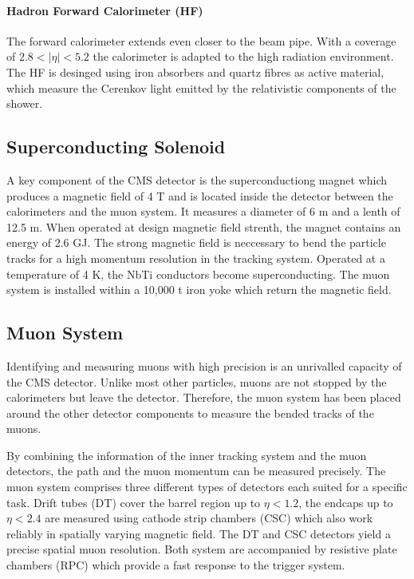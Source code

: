 \paragraph{Hadron Forward Calorimeter (HF)} 
The forward calorimeter extends even closer to the beam pipe. With a coverage of
$2.8 < |\eta| < 5.2$ the calorimeter is adapted to the high radiation
environment. The HF is desinged using iron absorbers and quartz fibres as active
material, which measure the Cerenkov light emitted by the relativistic
components of the shower.

\subsection{Superconducting Solenoid}

A key component of the CMS detector is the superconductiong magnet which
produces a magnetic field of 4 T and is located inside the detector between the
calorimeters and the muon system. It measures a diameter of 6 m and a lenth of
12.5 m. When operated at design magnetic field strenth, the magnet contains an
energy of 2.6 GJ. The strong magnetic field is neccessary to bend the particle
tracks for a high momentum resolution in the tracking system. Operated at a
temperature of 4 K, the NbTi conductors become superconducting. The muon system
is installed within a 10,000 t iron yoke which return the magnetic field.

\subsection{Muon System}

Identifying and measuring muons with high precision is an unrivalled capacity of
the CMS detector. Unlike most other particles, muons are not stopped by the
calorimeters but leave the detector. Therefore, the muon system has been placed
around the other detector components to measure the bended tracks of the muons.

By combining the information of the inner tracking system and the muon
detectors, the path and the muon momentum can be measured precisely. The muon
system comprises three different types of detectors each suited for a specific
task. Drift tubes (DT) cover the barrel region up to $\eta < 1.2$, the endcaps
up to $\eta < 2.4$ are measured using cathode strip chambers (CSC) which also
work reliably in spatially varying magnetic field. The DT and CSC detectors
yield a precise spatial muon resolution. Both system are accompanied by
resistive plate chambers (RPC) which provide a fast response to the trigger
system.

